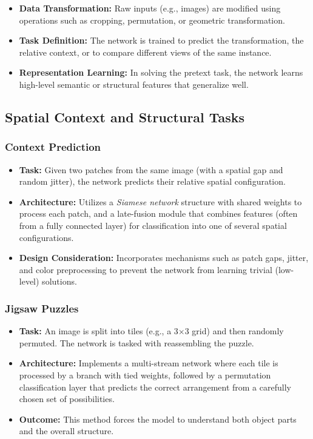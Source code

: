\documentclass{article}
\begin{document}
\begin{itemize}
    \item \textbf{Data Transformation:} Raw inputs (e.g., images) are modified using operations such as cropping, permutation, or geometric transformation.
    \item \textbf{Task Definition:} The network is trained to predict the transformation, the relative context, or to compare different views of the same instance.
    \item \textbf{Representation Learning:} In solving the pretext task, the network learns high-level semantic or structural features that generalize well.
\end{itemize}

\subsection{Spatial Context and Structural Tasks}
\subsubsection{Context Prediction}
\begin{itemize}
    \item \textbf{Task:} Given two patches from the same image (with a spatial gap and random jitter), the network predicts their relative spatial configuration.
    \item \textbf{Architecture:} Utilizes a \emph{Siamese network} structure with shared weights to process each patch, and a late-fusion module that combines features (often from a fully connected layer) for classification into one of several spatial configurations.
    \item \textbf{Design Consideration:} Incorporates mechanisms such as patch gaps, jitter, and color preprocessing to prevent the network from learning trivial (low-level) solutions.
\end{itemize}

\subsubsection{Jigsaw Puzzles}
\begin{itemize}
    \item \textbf{Task:} An image is split into tiles (e.g., a 3$\times$3 grid) and then randomly permuted. The network is tasked with reassembling the puzzle.
    \item \textbf{Architecture:} Implements a multi-stream network where each tile is processed by a branch with tied weights, followed by a permutation classification layer that predicts the correct arrangement from a carefully chosen set of possibilities.
    \item \textbf{Outcome:} This method forces the model to understand both object parts and the overall structure.
\end{itemize}
\end{document}
